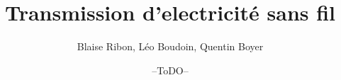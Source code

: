 ﻿\documentclass[11pt,a4paper]{report}
\begin{document}
\title{Transmission d'electricité sans fil}
\author{Blaise Ribon, Léo Boudoin, Quentin Boyer}
\date{--ToDO--}
\end{document}
